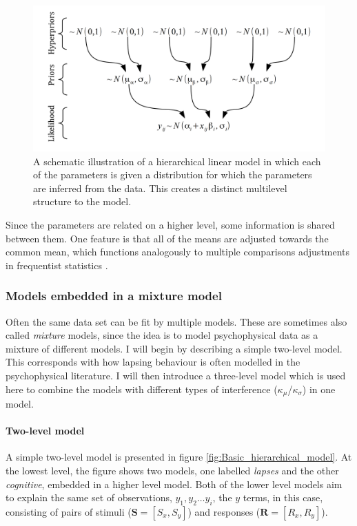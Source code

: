 \documentclass{article}\usepackage{knitr}
\begin{document}
\begin{figure}[!htb]
\includegraphics{Hierarchical_model_for_groups}
\caption{A schematic illustration of a hierarchical linear model in which each of the parameters is given a distribution for which the parameters are inferred from the data. This creates a distinct multilevel structure to the model.}
\label{fig:hierarchical_model_for_groups}
\end{figure}

Since the parameters are related on a higher level, some information is shared between them. One feature is that all of the means are adjusted towards the common mean, which functions analogously to multiple comparisons adjustments in frequentist statistics \citep{gelman2012}. 

\subsubsection*{Models embedded in a mixture model} 

Often the same data set can be fit by multiple models. These are sometimes also called \textit{mixture} models, since the idea is to model psychophysical data as a mixture of different models. I will begin by describing a simple two-level model. This corresponds with how lapsing behaviour is often modelled in the psychophysical literature. I will then introduce a three-level model which is used here to combine the models with different types of interference ($\kappa_{\mu}$/$\kappa_{\sigma}$) in one model.  

\paragraph{Two-level model}

A simple two-level model is presented in figure \ref{fig:Basic_hierarchical_model}. At the lowest level, the figure shows two models, one labelled \textit{lapses} and the other \textit{cognitive}, embedded in a higher level model. Both of the lower level models aim to explain the same set of observations, $y_1, y_2 \dots y_i$, the $y$ terms, in this case, consisting of pairs of stimuli ($\bm{S} = [S_x, S_y]$) and responses ($\bm{R} = [R_x, R_y]$). 
\end{document}
